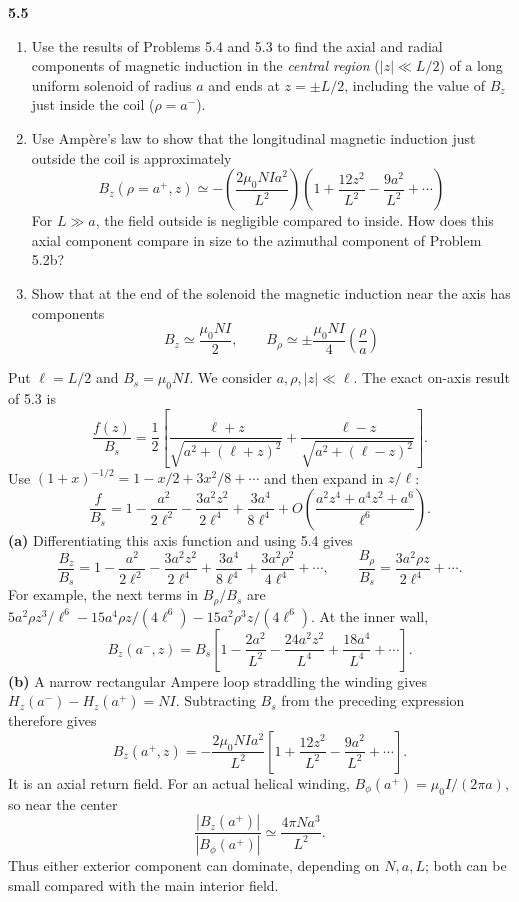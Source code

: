 \par\bigskip
\noindent\textbf{5.5}\quad\begin{enumerate}
\item[(a)] Use the results of Problems 5.4 and 5.3 to find the axial and radial components of magnetic induction in the \emph{central region} ($|z|\ll L/2$) of a long uniform solenoid of radius $a$ and ends at $z=\pm L/2$, including the value of $B_{z}$ just inside the coil ($\rho=a^{-}$).
\item[(b)] Use Amp\`ere's law to show that the longitudinal magnetic induction just outside the coil is approximately
\[
B_{z}(\rho=a^{+},z)\simeq-\left(\frac{2\mu_{0}NIa^{2}}{L^{2}}\right)\!\left(1+\frac{12z^{2}}{L^{2}}-\frac{9a^{2}}{L^{2}}+\cdots\right)
\]
For $L\gg a$, the field outside is negligible compared to inside. How does this axial component compare in size to the azimuthal component of Problem 5.2b?
\item[(c)] Show that at the end of the solenoid the magnetic induction near the axis has components
\[
B_{z}\simeq\frac{\mu_{0}NI}{2},\qquad B_{\rho}\simeq\pm\frac{\mu_{0}NI}{4}\left(\frac{\rho}{a}\right)
\]
\end{enumerate}
\solution
Put $\ell=L/2$ and $B_s=\mu_0NI$. We consider $a,\rho,|z|\ll\ell$.
The exact on-axis result of 5.3 is
\[
\frac{f(z)}{B_s}
=\frac12\left[\frac{\ell+z}{\sqrt{a^2+(\ell+z)^2}}
+\frac{\ell-z}{\sqrt{a^2+(\ell-z)^2}}\right].
\]
Use $(1+x)^{-1/2}=1-x/2+3x^2/8+\cdots$ and then expand in $z/\ell$:
\[
\frac f{B_s}
=1-\frac{a^2}{2\ell^2}-\frac{3a^2z^2}{2\ell^4}
+\frac{3a^4}{8\ell^4}
+O\left(\frac{a^2z^4+a^4z^2+a^6}{\ell^6}\right).
\]
\textbf{(a)} Differentiating this axis function and using 5.4 gives
\[
\boxed{\frac{B_z}{B_s}
=1-\frac{a^2}{2\ell^2}
-\frac{3a^2z^2}{2\ell^4}
+\frac{3a^4}{8\ell^4}
+\frac{3a^2\rho^2}{4\ell^4}+\cdots,\qquad
\frac{B_\rho}{B_s}=\frac{3a^2\rho z}{2\ell^4}+\cdots.}
\]
For example, the next terms in $B_\rho/B_s$ are
$5a^2\rho z^3/\ell^6-15a^4\rho z/(4\ell^6)
-15a^2\rho^3z/(4\ell^6)$.
At the inner wall,
\[
B_z(a^-,z)=B_s\left[1-\frac{2a^2}{L^2}
-\frac{24a^2z^2}{L^4}+\frac{18a^4}{L^4}+\cdots\right].
\]
\textbf{(b)} A narrow rectangular Ampere loop straddling the winding
gives $H_z(a^-)-H_z(a^+)=NI$. Subtracting $B_s$ from the preceding
expression therefore gives
\[
\boxed{B_z(a^+,z)=-\frac{2\mu_0NIa^2}{L^2}
\left[1+\frac{12z^2}{L^2}-\frac{9a^2}{L^2}+\cdots\right].}
\]
It is an axial return field. For an actual helical winding,
$B_\phi(a^+)=\mu_0I/(2\pi a)$, so near the center
\[
\frac{|B_z(a^+)|}{|B_\phi(a^+)|}\simeq
\frac{4\pi Na^3}{L^2}.
\]
Thus either exterior component can dominate, depending on $N,a,L$;
both can be small compared with the main interior field.

